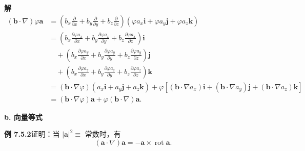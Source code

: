 \documentclass[UTF8,12pt,a4paper,fontset=fandol]{ctexart}
\begin{document}
\noindent\textbf{解}\quad
\[
\begin{aligned}
(\mathbf b\cdot\nabla)\varphi\mathbf a
&=\left(b_x\frac\partial{\partial x}+b_y\frac\partial{\partial y}+b_z\frac\partial{\partial z}\right)
(\varphi a_x\mathbf i+\varphi a_y\mathbf j+\varphi a_z\mathbf k)\\
&=\left(b_x\frac{\partial\varphi a_x}{\partial x}+b_y\frac{\partial\varphi a_x}{\partial y}+b_z\frac{\partial\varphi a_x}{\partial z}\right)\mathbf i\\
&\quad+\left(b_x\frac{\partial\varphi a_y}{\partial x}+b_y\frac{\partial\varphi a_y}{\partial y}+b_z\frac{\partial\varphi a_y}{\partial z}\right)\mathbf j\\
&\quad+\left(b_x\frac{\partial\varphi a_z}{\partial x}+b_y\frac{\partial\varphi a_z}{\partial y}+b_z\frac{\partial\varphi a_z}{\partial z}\right)\mathbf k\\
&=(\mathbf b\cdot\nabla\varphi)(a_x\mathbf i+a_y\mathbf j+a_z\mathbf k)
+\varphi[(\mathbf b\cdot\nabla a_x)\mathbf i+(\mathbf b\cdot\nabla a_y)\mathbf j+(\mathbf b\cdot\nabla a_z)\mathbf k]\\
&=(\mathbf b\cdot\nabla\varphi)\mathbf a+\varphi(\mathbf b\cdot\nabla)\mathbf a.
\end{aligned}
\]

\noindent\textbf{b. 向量等式}

\noindent\textbf{例 7.5.2}\quad 证明：当 $|\mathbf a|^2\equiv$ 常数时，有
\[
(\mathbf a\cdot\nabla)\mathbf a=-\mathbf a\times\operatorname{rot}\mathbf a. \tag{1}
\]
\end{document}
